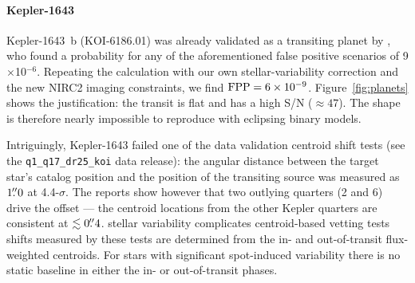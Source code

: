 \documentclass[12pt,twocolumn,tighten,linenumbers]{aastex63}
\begin{document}
\paragraph{Kepler-1643}
Kepler-1643~b (KOI-6186.01) was already validated as a transiting
planet by \citet{morton_false_2016}, who found a probability for any
of the aforementioned false positive scenarios of 9$\times$10$^{-6}$.
Repeating the calculation with our own stellar-variability correction
and the new NIRC2 imaging constraints, we find ${\rm FPP} =
6\times10^{-9}$.  Figure~\ref{fig:planets} shows the justification:
the transit is flat and has a high S/N ($\approx$$47$).  The shape is
therefore nearly impossible to reproduce with eclipsing binary models.

Intriguingly, Kepler-1643 failed one of the data validation
centroid shift tests (see the \texttt{q1\_q17\_dr25\_koi} data
release): the angular distance between the target star's catalog
position and the position of the transiting source was measured as
$1\mbox{$.\!\!^{\prime\prime}$}0$ at 4.4-$\sigma$.  The reports show however that two
outlying quarters (2 and 6) drive the offset --- the centroid locations
from the other Kepler quarters are consistent at $\lesssim 0\mbox{$.\!\!^{\prime\prime}$}4$.
 stellar
variability  complicates  centroid-based
vetting tests shifts measured by these tests are
determined from the in- and out-of-transit flux-weighted centroids.  For stars
with significant spot-induced variability there is no static baseline in either
the in- or out-of-transit phases.
\end{document}

